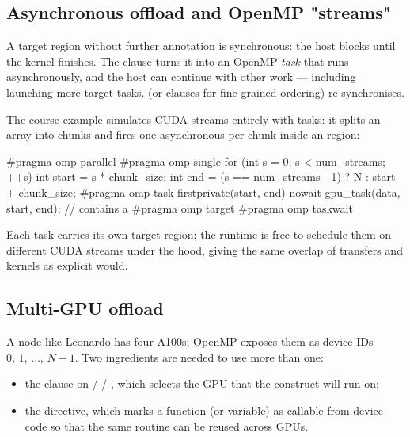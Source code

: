 \subsection{Asynchronous offload and OpenMP "streams"}

A target region without further annotation is synchronous: the host blocks until the kernel finishes. The  clause turns it into an OpenMP \emph{task} that runs asynchronously, and the host can continue with other work --- including launching more target tasks.  (or  clauses for fine-grained ordering) re-synchronises.

The course example  simulates CUDA streams entirely with tasks: it splits an array into chunks and fires one asynchronous  per chunk inside an  region:

\begin{codeblock}[language=C]
#pragma omp parallel
{
    #pragma omp single
    {
        for (int s = 0; s < num_streams; ++s) {
            int start = s * chunk_size;
            int end   = (s == num_streams - 1) ? N : start + chunk_size;
            #pragma omp task firstprivate(start, end) nowait
            gpu_task(data, start, end);   // contains a #pragma omp target
        }
    }
    #pragma omp taskwait
}
\end{codeblock}

Each task carries its own target region; the runtime is free to schedule them on different CUDA streams under the hood, giving the same overlap of transfers and kernels as explicit  would.

\subsection{Multi-GPU offload}

A node like Leonardo has four A100s; OpenMP exposes them as device IDs $0,\,1,\,\dots,\,N{-}1$. Two ingredients are needed to use more than one:
\begin{itemize}
    \item the  clause on  /  / , which selects the GPU that the construct will run on;
    \item the  directive, which marks a function (or variable) as callable from device code so that the same routine can be reused across GPUs.
\end{itemize}

